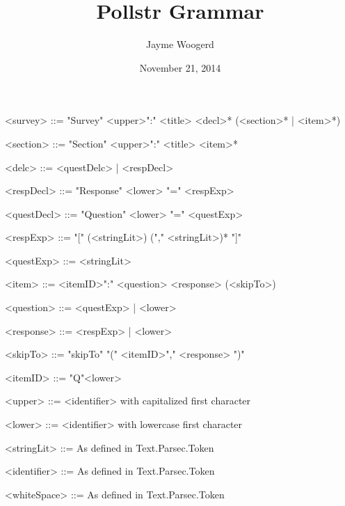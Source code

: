 \documentclass{article}
\title{Pollstr Grammar}
\author{Jayme Woogerd}
\date{November 21, 2014}
\begin{document}
\maketitle
\thispagestyle{empty}

\begin{grammar}

    <survey>     ::= "Survey"  <upper>":" <title> <decl>* (<section>* | <item>*)

    <section>    ::= "Section" <upper>":" <title> <item>* 

    <delc>       ::= <questDelc> | <respDecl>

    <respDecl>   ::= "Response" <lower> "=" <respExp>

    <questDecl>  ::= "Question" <lower> "=" <questExp>

    <respExp>    ::= "[" (<stringLit>) ("," <stringLit>)* "]"

    <questExp>   ::= <stringLit>

    <item>       ::= <itemID>":" <question> <response> (<skipTo>)

    <question>   ::= <questExp> | <lower>

    <response>   ::= <respExp> | <lower>

    <skipTo>     ::= "skipTo" "(" <itemID>"," <response> ")"

    <itemID>     ::= "Q"<lower>

    <upper> ::= <identifier> with capitalized first character
    
    <lower>      ::= <identifier> with lowercase first character

    <stringLit>  ::= As defined in Text.Parsec.Token

    <identifier> ::= As defined in Text.Parsec.Token

    <whiteSpace> ::= As defined in Text.Parsec.Token


\end{grammar}
\end{document}
